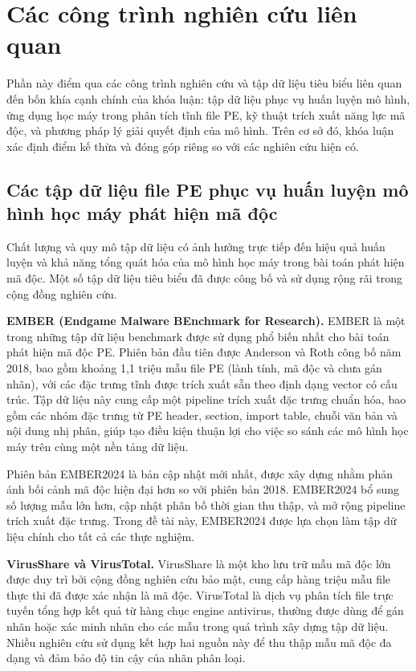 \section{Các công trình nghiên cứu liên quan}

Phần này điểm qua các công trình nghiên cứu và tập dữ liệu tiêu biểu
liên quan đến bốn khía cạnh chính của khóa luận: tập dữ liệu phục vụ
huấn luyện mô hình, ứng dụng học máy trong phân tích tĩnh file PE,
kỹ thuật trích xuất năng lực mã độc, và phương pháp lý giải quyết
định của mô hình. Trên cơ sở đó, khóa luận xác định điểm kế thừa và
đóng góp riêng so với các nghiên cứu hiện có.

\subsection{Các tập dữ liệu file PE phục vụ huấn luyện mô hình học máy phát hiện mã độc}

Chất lượng và quy mô tập dữ liệu có ảnh hưởng trực tiếp đến hiệu quả
huấn luyện và khả năng tổng quát hóa của mô hình học máy trong bài
toán phát hiện mã độc. Một số tập dữ liệu tiêu biểu đã được công bố
và sử dụng rộng rãi trong cộng đồng nghiên cứu.

\textbf{EMBER (Endgame Malware BEnchmark for Research).}
EMBER \cite{ember2018} là một trong những tập dữ liệu benchmark được
sử dụng phổ biến nhất cho bài toán phát hiện mã độc PE. Phiên bản đầu
tiên được Anderson và Roth công bố năm 2018, bao gồm khoảng 1,1 triệu
mẫu file PE (lành tính, mã độc và chưa gán nhãn), với các đặc trưng
tĩnh được trích xuất sẵn theo định dạng vector có cấu trúc. Tập dữ
liệu này cung cấp một pipeline trích xuất đặc trưng chuẩn hóa, bao
gồm các nhóm đặc trưng từ PE header, section, import table, chuỗi văn
bản và nội dung nhị phân, giúp tạo điều kiện thuận lợi cho việc so
sánh các mô hình học máy trên cùng một nền tảng dữ liệu.

Phiên bản EMBER2024 \cite{ember2024benchmark} là bản cập nhật mới nhất, được
xây dựng nhằm phản ánh bối cảnh mã độc hiện đại hơn so với phiên bản
2018. EMBER2024 bổ sung số lượng mẫu lớn hơn, cập nhật phân bố thời
gian thu thập, và mở rộng pipeline trích xuất đặc trưng. Trong đề tài
này, EMBER2024 được lựa chọn làm tập dữ liệu chính cho tất cả các
thực nghiệm.

\textbf{VirusShare và VirusTotal.}
VirusShare \cite{virusshare} là một kho lưu trữ mẫu mã độc lớn được
duy trì bởi cộng đồng nghiên cứu bảo mật, cung cấp hàng triệu mẫu
file thực thi đã được xác nhận là mã độc. VirusTotal \cite{virustotal}
là dịch vụ phân tích file trực tuyến tổng hợp kết quả từ hàng chục
engine antivirus, thường được dùng để gán nhãn hoặc xác minh nhãn cho
các mẫu trong quá trình xây dựng tập dữ liệu. Nhiều nghiên cứu sử
dụng kết hợp hai nguồn này để thu thập mẫu mã độc đa dạng và đảm bảo
độ tin cậy của nhãn phân loại.

